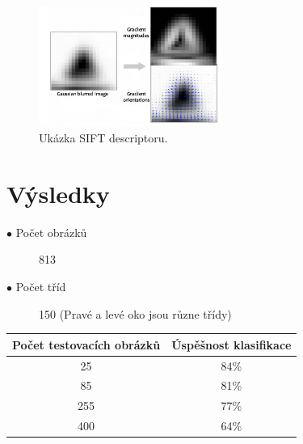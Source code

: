 \documentclass[a4paper,10pt,twocolumn]{article}
\begin{document}
\begin{figure}[H]
      \begin{center}
            \includegraphics[width=6cm]{imgs/sift-orientation-window.jpg}
      \end{center}
      \caption{Ukázka SIFT descriptoru.}
\end{figure}




%
\section{Výsledky}

\begin{description}
    \item[$\bullet$ Počet obrázků]  813
    \item[$\bullet$ Počet tříd] 150 (Pravé a levé oko jsou různe třídy)
\end{description}

\begin{center}
    \begin{tabular}{||c c||}
        \hline
        Počet testovacích obrázků  & Úspěšnost klasifikace\\ [0.5ex]
        \hline\hline
        25 & 84\% \\
        \hline
        85 & 81\% \\
        \hline
        255 & 77\% \\
        \hline
        400 & 64\% \\
        \hline
        \hline
    \end{tabular}
\end{center}




%
\end{document}
